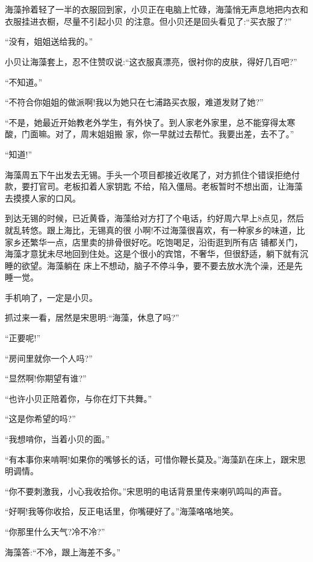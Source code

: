 \documentclass[11pt,a4paper,onecolumn]{article}
\begin{document}
\section[\thesection]{}

海藻拎着轻了一半的衣服回到家，小贝正在电脑上忙碌，海藻悄无声息地把内衣和衣服挂进衣橱，尽量不引起小贝
的注意。但小贝还是回头看见了:``买衣服了?''

``没有，姐姐送给我的。''

小贝让海藻套上，忍不住赞叹说:``这衣服真漂亮，很衬你的皮肤，得好几百吧?''

``不知道。''

``不符合你姐姐的做派啊!我以为她只在七浦路买衣服，难道发财了她?''

``不是，她最近开始教老外学生，有外快了。到人家老外家里，总不能穿得太寒酸，门面嘛。对了，周末姐姐搬
家，你一早就过去帮忙。我要出差，去不了。''

``知道!''

海藻周五下午出发去无锡。手头一个项目都接近收尾了，对方抓住个错误拒绝付款，要打官司。老板扣着人家钥匙
不给，陷入僵局。老板暂时不想出面，让海藻去摸摸人家的口风。

到达无锡的时候，已近黄昏，海藻给对方打了个电话，约好周六早上8点见，然后就乱转悠。跟上海比，无锡真的很
小啊!不过海藻很喜欢，有一种家乡的味道，比家乡还繁华一点，店里卖的排骨很好吃。吃饱喝足，沿街逛到所有店
铺都关门，海藻才意犹未尽地回到住处。这是个很小的宾馆，不奢华，但很舒适，躺下就有沉睡的欲望。海藻躺在
床上不想动，脑子不停斗争，要不要去放水洗个澡，还是先睡一觉。

手机响了，一定是小贝。

抓过来一看，居然是宋思明:``海藻，休息了吗?''

``正要呢!''

``房间里就你一个人吗?''

``显然啊!你期望有谁?''

``也许小贝正陪着你，与你在灯下共舞。''

``这是你希望的吗?''

``我想啃你，当着小贝的面。''

``有本事你来啃啊!如果你的嘴够长的话，可惜你鞭长莫及。''海藻趴在床上，跟宋思明调情。

``你不要刺激我，小心我收拾你。''宋思明的电话背景里传来喇叭鸣叫的声音。

``好啊!我等你收拾，反正电话里，你嘴硬好了。''海藻咯咯地笑。

``你那里什么天气?冷不冷?''

海藻答:``不冷，跟上海差不多。''
\end{document}
